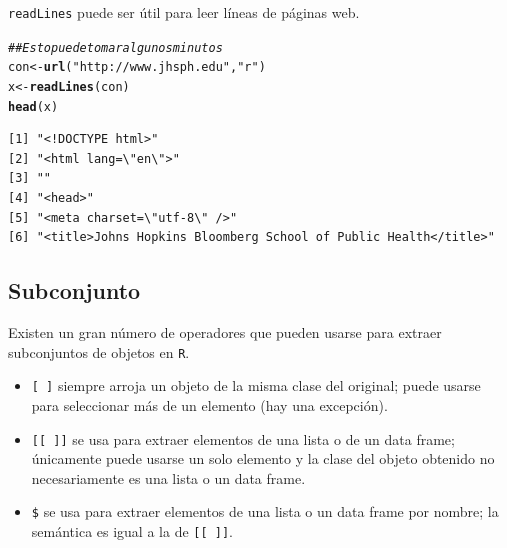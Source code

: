 \documentclass{article}\usepackage[]{graphicx}\usepackage[]{color}
\makeatletter
\newcommand{\hlstr}[1]{\textcolor[rgb]{0.192,0.494,0.8}{#1}}%
\newcommand{\hlcom}[1]{\textcolor[rgb]{0.678,0.584,0.686}{\textit{#1}}}%
\newcommand{\hlstd}[1]{\textcolor[rgb]{0.345,0.345,0.345}{#1}}%
\newcommand{\hlkwb}[1]{\textcolor[rgb]{0.69,0.353,0.396}{#1}}%
\newcommand{\hlkwd}[1]{\textcolor[rgb]{0.737,0.353,0.396}{\textbf{#1}}}%
\newenvironment{kframe}{%
 \def\at@end@of@kframe{}%
 \ifinner\ifhmode%
  \def\at@end@of@kframe{\end{minipage}}%
  \begin{minipage}{\columnwidth}%
 \fi\fi%
 \def\FrameCommand##1{\hskip\@totalleftmargin \hskip-\fboxsep
 \colorbox{shadecolor}{##1}\hskip-\fboxsep
     \hskip-\linewidth \hskip-\@totalleftmargin \hskip\columnwidth}%
 \MakeFramed {\advance\hsize-\width
   \@totalleftmargin\z@ \linewidth\hsize
   \@setminipage}}%
 {\par\unskip\endMakeFramed%
 \at@end@of@kframe}
\newenvironment{knitrout}{}{} %
\makeatother
\begin{document}
  \texttt{readLines} puede ser útil para leer líneas de páginas web.
\begin{knitrout}
\color{fgcolor}\begin{kframe}
\begin{alltt}
  \hlcom{## Esto puede tomar algunos minutos}
  \hlstd{con} \hlkwb{<-} \hlkwd{url}\hlstd{(}\hlstr{"http://www.jhsph.edu"}\hlstd{,} \hlstr{"r"}\hlstd{)}
  \hlstd{x} \hlkwb{<-} \hlkwd{readLines}\hlstd{(con)}
  \hlkwd{head}\hlstd{(x)}
\end{alltt}
\begin{verbatim}
[1] "<!DOCTYPE html>"                                               
[2] "<html lang=\"en\">"                                            
[3] ""                                                              
[4] "<head>"                                                        
[5] "<meta charset=\"utf-8\" />"                                    
[6] "<title>Johns Hopkins Bloomberg School of Public Health</title>"
\end{verbatim}
\end{kframe}
\end{knitrout}

  \subsection{Subconjunto}
  Existen un gran número de operadores que pueden usarse para extraer subconjuntos de objetos en \texttt{R}. 
  \begin{itemize}
    \item \texttt{[ ]} siempre arroja un objeto de la misma clase del original; puede usarse para seleccionar más de un elemento (hay una excepción).
    \item \texttt{[[ ]]} se usa para extraer elementos de una lista o de un data frame; únicamente puede usarse un solo elemento y la clase del objeto obtenido no necesariamente es una lista o un data frame.
    \item \texttt{\$} se usa para extraer elementos de una lista o un data frame por nombre; la semántica es igual a la de \texttt{[[ ]]}.
  \end{itemize}
\end{document}
